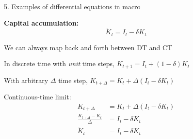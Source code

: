 \documentclass[11pt, aspectratio=169]{beamer}
\newenvironment{witemize}{\itemize\addtolength{\itemsep}{10pt}}{\enditemize}
\begin{document}
\begin{frame}{5. Examples of differential equations in macro}

\textbf{Capital accumulation:}
\begin{equation*}
\dot K_t = I_t - \delta K_t
\end{equation*}
\begin{witemize}
\item We can always map back and forth between DT and CT

\item In discrete time with \textit{unit} time steps, $K_{t+1} = I_t + (1-\delta) K_t$

\item With arbitrary $\Delta$ time step, $K_{t+\Delta} = K_t + \Delta (I_t - \delta K_t)$

\item Continuous-time limit:
\begin{align*}
	K_{t+\Delta} &= K_t + \Delta (I_t - \delta K_t) \\
	\frac{K_{t+\Delta} - K_t}{\Delta} &= I_t -\delta K_t \\
	\dot K_t &= I_t -\delta K_t
\end{align*}
\end{witemize}
\end{frame}
\end{document}
